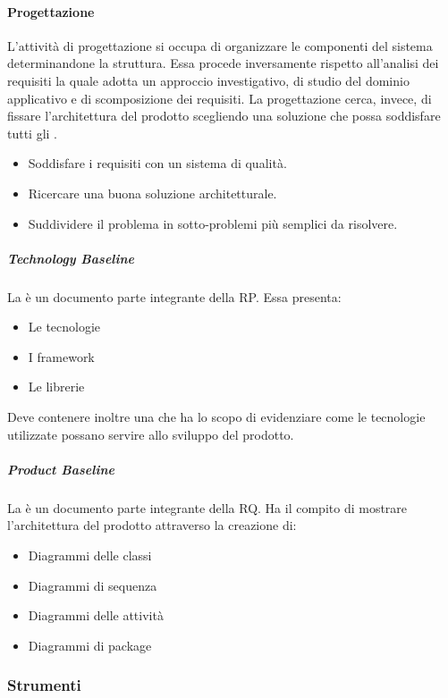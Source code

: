 \documentclass[../norme-di-progetto.tex]{subfiles}
\begin{document}
\paragraph{Progettazione}%
\label{par:progettazione}
L'attività di progettazione si occupa di organizzare le componenti del sistema determinandone la struttura. Essa procede inversamente rispetto all'analisi dei requisiti la quale adotta un approccio investigativo, di studio del dominio applicativo e di scomposizione dei requisiti. La progettazione cerca, invece, di fissare l'architettura del prodotto scegliendo una soluzione che possa soddisfare tutti gli .
\begin{itemize}
  \item Soddisfare i requisiti con un sistema di qualità.
  \item Ricercare una buona soluzione architetturale.
  \item Suddividere il problema in sotto-problemi più semplici da risolvere.
\end{itemize}

\subparagraph{Technology Baseline}%
\label{subp:technology_baseline}
La  è un documento parte integrante della RP. Essa presenta:
\begin{itemize}
  \item Le tecnologie
  \item I framework
  \item Le librerie
\end{itemize}
Deve contenere inoltre una  che ha lo scopo di evidenziare come le tecnologie utilizzate possano servire allo sviluppo del prodotto.

\subparagraph{Product Baseline}%
\label{subp:product_baseline}
La  è un documento parte integrante della RQ. Ha il compito di mostrare l'architettura del prodotto attraverso la creazione di:
\begin{itemize}
  \item Diagrammi delle classi
  \item Diagrammi di sequenza
  \item Diagrammi delle attività
  \item Diagrammi di package
\end{itemize}

\subsubsection{Strumenti}%
\label{subs:strumenti}
\end{document}
